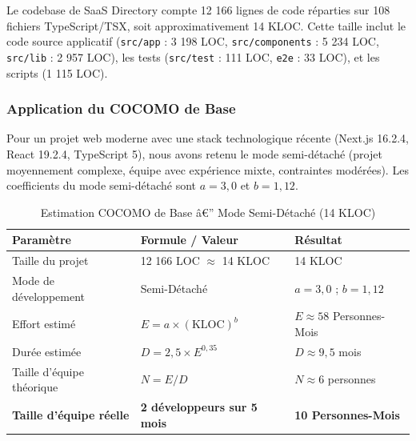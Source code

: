 Le codebase de SaaS Directory compte 12 166 lignes de code réparties sur 108 fichiers TypeScript/TSX, soit approximativement 14 KLOC. Cette taille inclut le code source applicatif (\texttt{src/app} : 3 198 LOC, \texttt{src/components} : 5 234 LOC, \texttt{src/lib} : 2 957 LOC), les tests (\texttt{src/test} : 111 LOC, \texttt{e2e} : 33 LOC), et les scripts (1 115 LOC).



\subsubsection{Application du COCOMO de Base}



Pour un projet web moderne avec une stack technologique récente (Next.js 16.2.4, React 19.2.4, TypeScript 5), nous avons retenu le mode semi-détaché (projet moyennement complexe, équipe avec expérience mixte, contraintes modérées). Les coefficients du mode semi-détaché sont $a = 3{,}0$ et $b = 1{,}12$.



\begin{table}[H]

\centering

\caption{Estimation COCOMO de Base â€” Mode Semi-Détaché (14 KLOC)}

\label{tab:cocomo}

\begin{tabular}{@{}lll@{}}

\toprule

\textbf{Paramètre} & \textbf{Formule / Valeur} & \textbf{Résultat} \\

\midrule

Taille du projet & 12 166 LOC $\approx$ 14 KLOC & 14 KLOC \\

Mode de développement & Semi-Détaché & $a = 3{,}0$ ; $b = 1{,}12$ \\

Effort estimé & $E = a \times (\text{KLOC})^b$ & $E \approx 58$ Personnes-Mois \\

Durée estimée & $D = 2{,}5 \times E^{0{,}35}$ & $D \approx 9{,}5$ mois \\

Taille d'équipe théorique & $N = E / D$ & $N \approx 6$ personnes \\

\midrule

\textbf{Taille d'équipe réelle} & \textbf{2 développeurs sur 5 mois} & \textbf{10 Personnes-Mois} \\

\bottomrule

\end{tabular}

\end{table}



